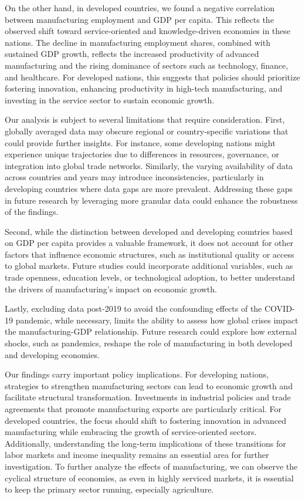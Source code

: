 \documentclass[12pt]{article}
\begin{document}
    On the other hand, in developed countries, we found a negative correlation between manufacturing employment and GDP per capita. This reflects the observed shift toward service-oriented and knowledge-driven economies in these nations. The decline in manufacturing employment shares, combined with sustained GDP growth, reflects the increased productivity of advanced manufacturing and the rising dominance of sectors such as technology, finance, and healthcare. For developed nations, this suggests that policies should prioritize fostering innovation, enhancing productivity in high-tech manufacturing, and investing in the service sector to sustain economic growth. 
   
    Our analysis is subject to several limitations that require consideration. First, globally averaged data may obscure regional or country-specific variations that could provide further insights. For instance, some developing nations might experience unique trajectories due to differences in resources, governance, or integration into global trade networks. Similarly, the varying availability of data across countries and years may introduce inconsistencies, particularly in developing countries where data gaps are more prevalent. Addressing these gaps in future research by leveraging more granular data could enhance the robustness of the findings.
    
    Second, while the distinction between developed and developing countries based on GDP per capita provides a valuable framework, it does not account for other factors that influence economic structures, such as institutional quality or access to global markets. Future studies could incorporate additional variables, such as trade openness, education levels, or technological adoption, to better understand the drivers of manufacturing's impact on economic growth.
   
    Lastly, excluding data post-2019 to avoid the confounding effects of the COVID-19 pandemic, while necessary, limits the ability to assess how global crises impact the manufacturing-GDP relationship. Future research could explore how external shocks, such as pandemics, reshape the role of manufacturing in both developed and developing economies.
   
    Our findings carry important policy implications. For developing nations, strategies to strengthen manufacturing sectors can lead to economic growth and facilitate structural transformation. Investments in industrial policies and trade agreements that promote manufacturing exports are particularly critical. For developed countries, the focus should shift to fostering innovation in advanced manufacturing while embracing the growth of service-oriented sectors. Additionally, understanding the long-term implications of these transitions for labor markets and income inequality remains an essential area for further investigation. To further analyze the effects of manufacturing, we can observe the cyclical structure of economies, as even in highly serviced markets, it is essential to keep the primary sector running, especially agriculture. 
   
\end{document}
